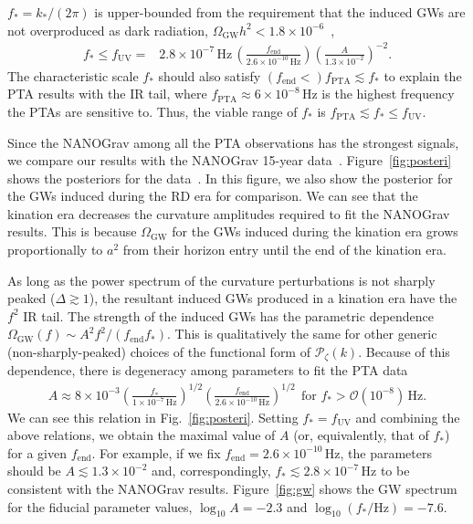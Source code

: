 \documentclass[superscriptaddress, aps, preprintnumbers,
amsmath, amssymb, sort&compress, nofootinbib, 10pt, paper, floatfix]{revtex4-2}
\newcommand{\GW}{\text{GW}}
\newcommand{\Hz}{\text{Hz}}
\newcommand{\en}{{\text{end}}}
\begin{document}
$f_*= k_*/(2\pi)$ is upper-bounded from the requirement that the induced GWs are not overproduced as dark radiation, $\Omega_\text{GW}h^2 < 1.8 \times 10^{-6}$~\cite{Kohri:2018awv, Clarke:2020bil}, 
\begin{align}
    f_* \leq f_\text{UV} = & 2.8 \times 10^{-7} \, \mathrm{Hz} \, \left( \frac{f_\text{end}}{2.6 \times 10^{-10} \, \mathrm{Hz}} \right) \left( \frac{A}{1.3 \times 10^{-2}} \right)^{-2}. \label{f_UV}
\end{align}
The characteristic scale $f_*$ should also satisfy $(f_\text{end} < )f_\text{PTA} \lesssim f_*$ to explain the PTA results with the IR tail, where $f_\text{PTA} \approx 6 \times 10^{-8} \, \mathrm{Hz}$ is the highest frequency the PTAs are sensitive to. Thus, the viable range of $f_*$ is $f_\text{PTA} \lesssim f_* \leq f_\text{UV}$.

Since the NANOGrav among all the PTA observations has the strongest signals, we compare our results with the NANOGrav 15-year data~\cite{NANOGrav:2023gor,NANOGrav:2023hvm}. 
Figure~\ref{fig:posteri} shows the posteriors for the data~\cite{NANOGrav:2023gor,NANOGrav:2023hvm}. 
In this figure, we also show the posterior for the GWs induced during the RD era for comparison.
We can see that the kination era decreases the curvature amplitudes required to fit the NANOGrav results.
This is because $\Omega_\GW$ for the GWs induced during the kination era grows proportionally to $a^2$ from their horizon entry until the end of the kination era.


As long as the power spectrum of the curvature perturbations is not sharply peaked ($\Delta \gtrsim 1$), the resultant induced GWs produced in a kination era have the $f^2$ IR tail. The strength of the induced GWs has the parametric dependence $\Omega_\text{GW}(f) \sim A^2 f^2 /(f_\text{end} f_*) $. This is qualitatively the same for other generic (non-sharply-peaked) choices of the functional form of $\mathcal{P}_\zeta (k)$. Because of this dependence, there is degeneracy among parameters to fit the PTA data
\begin{align}
    A \approx 
    8 \times 10^{-3} \left( \frac{f_*}{1 \times 10^{-7} \, \mathrm{Hz}} \right)^{1/2}\left( \frac{f_\en}{2.6 \times 10^{-10} \, \mathrm{Hz}}\right)^{1/2} \ \ \text{for } f_* > \mathcal O(10^{-8})\,\Hz . \label{degeneracy_relation}
\end{align}
We can see this relation in Fig.~\ref{fig:posteri}. 
Setting $f_* = f_\text{UV}$ and combining the above relations, we obtain the maximal value of $A$ (or, equivalently, that of $f_*$) for a given $f_\text{end}$. 
For example, if we fix $f_\text{end} = 2.6 \times 10^{-10} \, \mathrm{Hz}$, the parameters should be $A \lesssim 1.3 \times 10^{-2}$ and, correspondingly, $f_* \lesssim 2.8 \times 10^{-7} \, \mathrm{Hz}$ to be consistent with the NANOGrav results.
Figure~\ref{fig:gw} shows the GW spectrum for the fiducial parameter values, $\log_{10} A = -2.3$ and $\log_{10}(f_*/\text{Hz}) = -7.6$.
\end{document}
